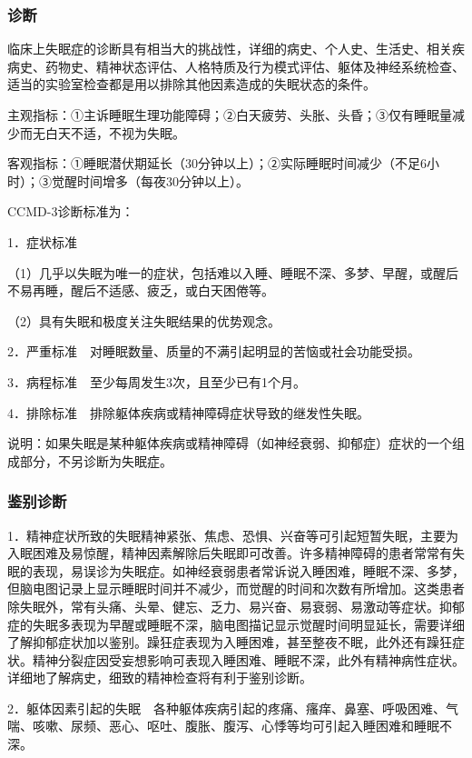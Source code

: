\subsubsection{诊断}

临床上失眠症的诊断具有相当大的挑战性，详细的病史、个人史、生活史、相关疾病史、药物史、精神状态评估、人格特质及行为模式评估、躯体及神经系统检查、适当的实验室检查都是用以排除其他因素造成的失眠状态的条件。

主观指标：①主诉睡眠生理功能障碍；②白天疲劳、头胀、头昏；③仅有睡眠量减少而无白天不适，不视为失眠。

客观指标：①睡眠潜伏期延长（30分钟以上）；②实际睡眠时间减少（不足6小时）；③觉醒时间增多（每夜30分钟以上）。

CCMD-3诊断标准为：

1．症状标准

（1）几乎以失眠为唯一的症状，包括难以入睡、睡眠不深、多梦、早醒，或醒后不易再睡，醒后不适感、疲乏，或白天困倦等。

（2）具有失眠和极度关注失眠结果的优势观念。

2．严重标准　对睡眠数量、质量的不满引起明显的苦恼或社会功能受损。

3．病程标准　至少每周发生3次，且至少已有1个月。

4．排除标准　排除躯体疾病或精神障碍症状导致的继发性失眠。

说明：如果失眠是某种躯体疾病或精神障碍（如神经衰弱、抑郁症）症状的一个组成部分，不另诊断为失眠症。

\subsubsection{鉴别诊断}

1．精神症状所致的失眠精神紧张、焦虑、恐惧、兴奋等可引起短暂失眠，主要为入眠困难及易惊醒，精神因素解除后失眠即可改善。许多精神障碍的患者常常有失眠的表现，易误诊为失眠症。如神经衰弱患者常诉说入睡困难，睡眠不深、多梦，但脑电图记录上显示睡眠时间并不减少，而觉醒的时间和次数有所增加。这类患者除失眠外，常有头痛、头晕、健忘、乏力、易兴奋、易衰弱、易激动等症状。抑郁症的失眠多表现为早醒或睡眠不深，脑电图描记显示觉醒时间明显延长，需要详细了解抑郁症状加以鉴别。躁狂症表现为入睡困难，甚至整夜不眠，此外还有躁狂症状。精神分裂症因受妄想影响可表现入睡困难、睡眠不深，此外有精神病性症状。详细地了解病史，细致的精神检查将有利于鉴别诊断。

2．躯体因素引起的失眠　各种躯体疾病引起的疼痛、瘙痒、鼻塞、呼吸困难、气喘、咳嗽、尿频、恶心、呕吐、腹胀、腹泻、心悸等均可引起入睡困难和睡眠不深。

